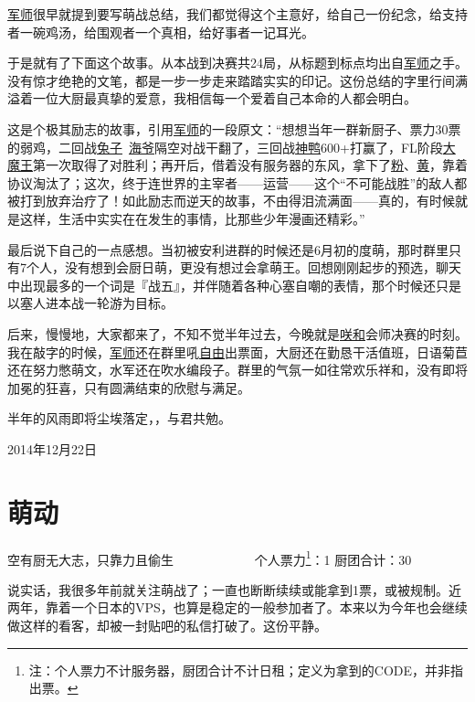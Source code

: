 \uline{军师}很早就提到要写萌战总结，我们都觉得这个主意好，给自己一份纪念，给支持者一碗鸡汤，给围观者一个真相，给好事者一记耳光。

于是就有了下面这个故事。从本战到决赛共24局，从标题到标点均出自\uline{军师}之手。没有惊才绝艳的文笔，都是一步一步走来踏踏实实的印记。这份总结的字里行间满溢着一位大厨最真挚的爱意，我相信每一个爱着自己本命的人都会明白。

这是个极其励志的故事，引用\uline{军师}的一段原文：“想想当年一群新厨子、票力30票的弱鸡，二回战\uline{兔子}~\uline{海爷}隔空对战干翻了，三回战\uline{神鸭}600+打赢了，FL阶段\uline{大魔王}第一次取得了对胜利；再开后，借着没有服务器的东风，拿下了\uline{粉}、\uline{黄}，靠着协议淘汰了；这次，终于连世界的主宰者——运营——这个“不可能战胜”的敌人都被打到放弃治疗了！如此励志而逆天的故事，不由得泪流满面——真的，有时候就是这样，生活中实实在在发生的事情，比那些少年漫画还精彩。”

最后说下自己的一点感想。当初被安利进群的时候还是6月初的度萌，那时群里只有7个人，没有想到会厨日萌，更没有想过会拿萌王。回想刚刚起步的预选，聊天中出现最多的一个词是『战五』，并伴随着各种心塞自嘲的表情，那个时候还只是以塞人进本战一轮游为目标。

后来，慢慢地，大家都来了，不知不觉半年过去，今晚就是\uline{咲}\uline{和}会师决赛的时刻。我在敲字的时候，\uline{军师}还在群里吼\uline{自由}出票面，大厨还在勤恳干活值班，日语菊苣还在努力憋萌文，水军还在吹水编段子。群里的气氛一如往常欢乐祥和，没有即将加冕的狂喜，只有圆满结束的欣慰与满足。

半年的风雨即将尘埃落定，，与君共勉。

\begin{flushright}

2014年12月22日
\end{flushright}

\chapter{萌动}

\begin{center}
{\subTitle 空有厨无大志，只靠力且偷生}
\subMemo
　　　　　　个人票力\footnote{注：个人票力不计服务器，厨团合计不计日租；定义为拿到的CODE，并非指出票。}：1 厨团合计：30
\end{center}

说实话，我很多年前就关注萌战了；一直也断断续续或能拿到1票，或被规制。近两年，靠着一个日本的VPS，也算是稳定的一般参加者了。本来以为今年也会继续做这样的看客，却被一封贴吧的私信打破了。这份平静。

